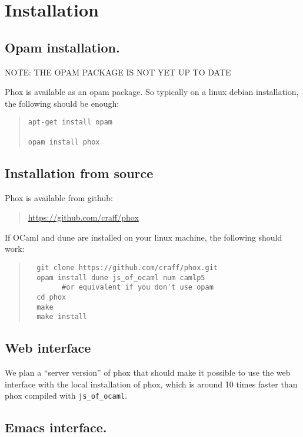 \chapter{Installation}

\section{Opam installation.}

NOTE: THE OPAM PACKAGE IS NOT YET UP TO DATE

Phox is available as an opam package. So typically on a linux debian
installation, the following should be enough:

\begin{quote}
\begin{verbatim}
apt-get install opam

opam install phox
\end{verbatim}
\end{quote}

\section{Installation from source}

Phox is available from github:

\begin{quote}
\url{https://github.com/craff/phox}
\end{quote}

If OCaml and dune are installed on your linux machine, the following should
work:
\begin{quote}
\begin{verbatim}
  git clone https://github.com/craff/phox.git
  opam install dune js_of_ocaml num camlp5
        #or equivalent if you don't use opam
  cd phox
  make
  make install
\end{verbatim}
\end{quote}

\section{Web interface}

We plan a ``server version'' of phox that should make it possible to use
the web interface with the local installation of phox, which is around 10
times faster than phox compiled with \verb#js_of_ocaml#.

\section{Emacs interface.}\label{interface}


